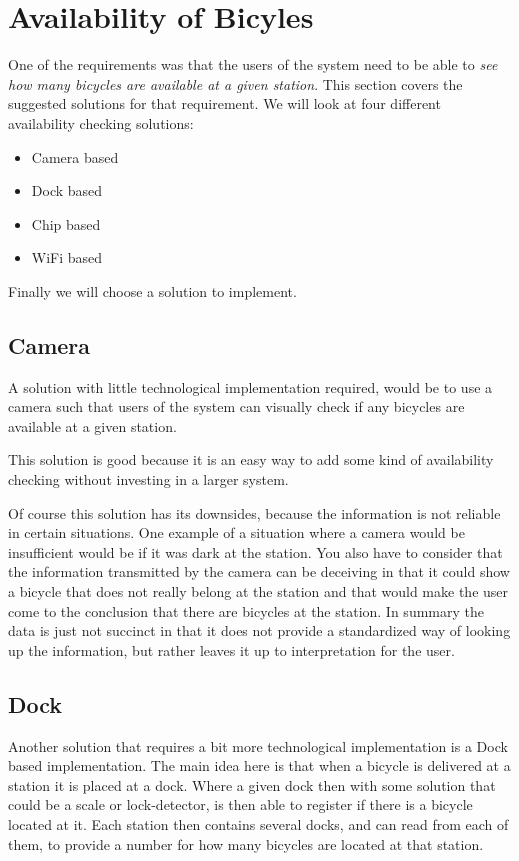 \section{Availability of Bicyles}\label{sec:availability}
One of the requirements was that the users of the system need to be able to \textit{see how many bicycles are available at a given station}.
This section covers the suggested solutions for that requirement.
We will look at four different availability checking solutions:

\begin{itemize}
\item Camera based
\item Dock based
\item Chip based
\item WiFi based
\end{itemize} 

Finally we will choose a solution to implement.

\subsection{Camera}
A solution with little technological implementation required, would be to use a camera such that users of the system can visually check if any bicycles are available at a given station. 

This solution is good because it is an easy way to add some kind of availability checking without investing in a larger system.

Of course this solution has its downsides, because the information is not reliable in certain situations. 
One example of a situation where a camera would be insufficient would be if it was dark at the station.
You also have to consider that the information transmitted by the camera can be deceiving in that it could show a bicycle that does not really belong at the station and that would make the user come to the conclusion that there are bicycles at the station.
In summary the data is just not succinct in that it does not provide a standardized way of looking up the information, but rather leaves it up to interpretation for the user.

\subsection{Dock}
Another solution that requires a bit more technological implementation is a Dock based implementation.
The main idea here is that when a bicycle is delivered at a station it is placed at a dock.
Where a given dock then with some solution that could be a scale or lock-detector, is then able to register if there is a bicycle located at it.
Each station then contains several docks, and can read from each of them, to provide a number for how many bicycles are located at that station. 

